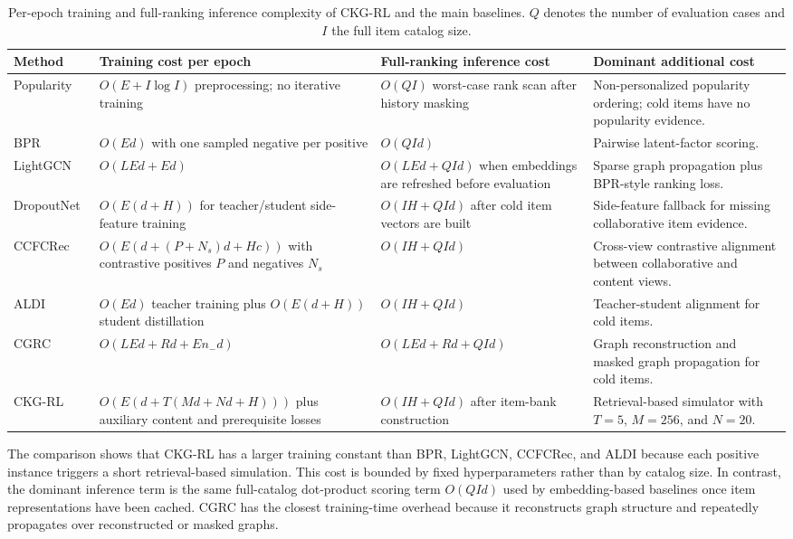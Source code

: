 \documentclass[sigconf,anonymous,review]{acmart}
\begin{document}
\begin{table}[t]
\centering
\caption{Per-epoch training and full-ranking inference complexity of CKG-RL and the main baselines. \(Q\) denotes the number of evaluation cases and \(I\) the full item catalog size.}
\label{tab:complexity}
\footnotesize
\setlength{\tabcolsep}{2.4pt}
\renewcommand{\arraystretch}{1.12}
\begin{tabular}{lp{4.3cm}p{4.2cm}p{5.2cm}}
\toprule
Method & Training cost per epoch & Full-ranking inference cost & Dominant additional cost \\
\midrule
Popularity & \(O(E + I\log I)\) preprocessing; no iterative training & \(O(QI)\) worst-case rank scan after history masking & Non-personalized popularity ordering; cold items have no popularity evidence. \\
BPR~\cite{rendle2009bpr} & \(O(Ed)\) with one sampled negative per positive & \(O(QId)\) & Pairwise latent-factor scoring. \\
LightGCN~\cite{he2020lightgcn} & \(O(LEd + Ed)\) & \(O(LEd + QId)\) when embeddings are refreshed before evaluation & Sparse graph propagation plus BPR-style ranking loss. \\
DropoutNet~\cite{volkovs2017dropoutnet} & \(O(E(d+H))\) for teacher/student side-feature training & \(O(IH + QId)\) after cold item vectors are built & Side-feature fallback for missing collaborative item evidence. \\
CCFCRec~\cite{zhou2023ccfcrec} & \(O(E(d + (P+N_s)d + Hc))\) with contrastive positives \(P\) and negatives \(N_s\) & \(O(IH + QId)\) & Cross-view contrastive alignment between collaborative and content views. \\
ALDI~\cite{huang2023aldi} & \(O(Ed)\) teacher training plus \(O(E(d+H))\) student distillation & \(O(IH + QId)\) & Teacher-student alignment for cold items. \\
CGRC~\cite{kim2024cgrc} & \(O(LEd + Rd + E n_{-}d)\) & \(O(LEd + Rd + QId)\) & Graph reconstruction and masked graph propagation for cold items. \\
CKG-RL & \(O(E(d + T(Md + Nd + H)))\) plus auxiliary content and prerequisite losses & \(O(IH + QId)\) after item-bank construction & Retrieval-based simulator with \(T=5\), \(M=256\), and \(N=20\). \\
\bottomrule
\end{tabular}
\end{table}

The comparison shows that CKG-RL has a larger training constant than BPR, LightGCN, CCFCRec, and ALDI because each positive instance triggers a short retrieval-based simulation. This cost is bounded by fixed hyperparameters rather than by catalog size. In contrast, the dominant inference term is the same full-catalog dot-product scoring term \(O(QId)\) used by embedding-based baselines once item representations have been cached. CGRC has the closest training-time overhead because it reconstructs graph structure and repeatedly propagates over reconstructed or masked graphs.
\end{document}
